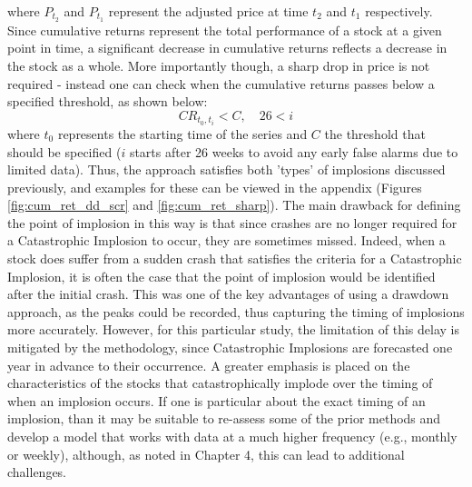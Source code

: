 \documentclass[a4paper]{report}
\begin{document}
where \(P_{t_2}\) and \(P_{t_1}\) represent the adjusted price at time \(t_2\) and \(t_1\) respectively. Since cumulative returns represent the total performance of a stock at a given point in time, a significant decrease in cumulative returns reflects a decrease in the stock 
as a whole. More importantly though, a sharp drop in price is not required - instead one can check when the cumulative returns passes below a specified threshold, as shown below:
\begin{equation}
  CR_{t_0,t_i} < C, \quad 26 < i
  \label{eq:point_impl}
\end{equation}
where \(t_0\) represents the starting time of the series and \(C\) the threshold that should be specified (\(i\) starts after 26 weeks to avoid any early false alarms due to limited data). 
Thus, the approach satisfies both 'types' of implosions discussed previously, and examples for these can be viewed in the appendix (Figures \ref{fig:cum_ret_dd_scr} and \ref{fig:cum_ret_sharp}). 
The main drawback for defining the point of implosion 
in this way is that since crashes are no longer required for a Catastrophic Implosion to occur, they are sometimes missed. Indeed, when a stock does suffer from a sudden crash that satisfies the criteria for a Catastrophic Implosion, it is often the case that the point of implosion would be identified after 
the initial crash. This was one of the key advantages of using a drawdown approach, as the peaks could be recorded, thus capturing the timing of implosions more accurately. However, for this particular study, the limitation of this delay is mitigated by the methodology, since Catastrophic Implosions
are forecasted one year in advance to their occurrence. A greater emphasis is placed on the characteristics of the stocks that catastrophically implode over the timing of when an implosion occurs. If one is particular about the exact timing of an implosion, than it may be 
suitable to re-assess some of the prior methods and develop a model that works with data at a much higher frequency (e.g., monthly or weekly), although, as noted in Chapter 4, this can lead to additional challenges.
\end{document}
